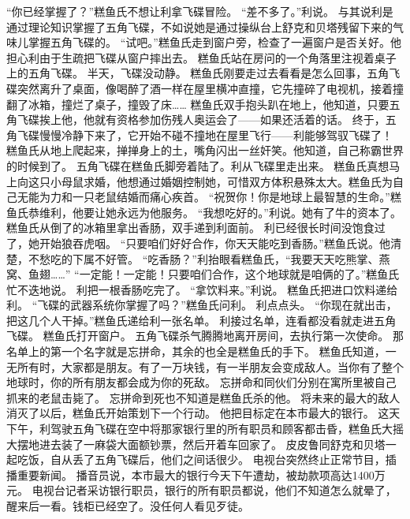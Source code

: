 \documentclass[a4paper,12pt,UTF8,twoside]{ctexbook}
\begin{document}
        “你已经掌握了？”糕鱼氏不想让利拿飞碟冒险。 
        “差不多了。”利说。 
        与其说利是通过理论知识掌握了五角飞碟，不如说她是通过操纵台上舒克和贝塔残留下来的气味儿掌握五角飞碟的。 
        “试吧。”糕鱼氏走到窗户旁，检查了一遍窗户是否关好。他担心利由于生疏把飞碟从窗户摔出去。 
        糕鱼氏站在房问的一个角落里注视着桌子上的五角飞碟。 
        半天，飞碟没动静。 
        糕鱼氏刚要走过去看看是怎么回事，五角飞碟突然离升了桌面，像喝醉了酒一样在屋里横冲直撞，它先撞碎了电视机，接着撞翻了冰箱，撞烂了桌子，撞毁了床…… 
        糕鱼氏双手抱头趴在地上，他知道，只要五角飞碟挨上他，他就有资格参加伤残人奥运会了——如果还活着的话。 
        终于，五角飞碟慢慢冷静下来了，它开始不碰不撞地在屋里飞行——利能够驾驭飞碟了！ 
        糕鱼氏从地上爬起来，掸掸身上的土，嘴角闪出一丝奸笑。他知道，自己称霸世界的时候到了。 
        五角飞碟在糕鱼氏脚旁着陆了。利从飞碟里走出来。 
        糕鱼氏真想马上向这只小母鼠求婚，他想通过婚姻控制她，可惜双方体积悬殊太大。糕鱼氏为自己无能为力和一只老鼠结婚而痛心疾首。 
        “祝贺你！你是地球上最智慧的生命。”糕鱼氏恭维利，他要让她永远为他服务。 
        “我想吃好的。”利说。她有了牛的资本了。 
        糕鱼氏从倒了的冰箱里拿出香肠，双手递到利面前。 
        利已经很长时间没饱食过了，她开始狼吞虎咽。 
        “只要咱们好好合作，你天天能吃到香肠。”糕鱼氏说。他清楚，不愁吃的下属不好管。 
        “吃香肠？”利抬眼看糕鱼氏，“我要天天吃熊掌、燕窝、鱼翅……” 
        “一定能！一定能！只要咱们合作，这个地球就是咱俩的了。”糕鱼氏忙不迭地说。 
        利把一根香肠吃完了。 
        “拿饮料来。”利说。 
        糕鱼氏把进口饮料递给利。 
        “飞碟的武器系统你掌握了吗？”糕鱼氏问利。 
        利点点头。 
        “你现在就出击，把这几个人干掉。”糕鱼氏递给利一张名单。 
        利接过名单，连看都没看就走进五角飞碟。 
        糕鱼氏打开窗户。 
        五角飞碟杀气腾腾地离开房间，去执行第一次使命。 
        那名单上的第一个名字就是忘拼命，其余的也全是糕鱼氏的手下。 
        糕鱼氏知道，一无所有时，大家都是朋友。有了一万块钱，有一半朋友会变成敌人。当你有了整个地球时，你的所有朋友都会成为你的死敌。 
        忘拼命和同伙们分别在寓所里被自己抓来的老鼠击毙了。 
        忘拼命到死也不知道是糕鱼氏杀的他。 
        将未来的最大的敌人消灭了以后，糕鱼氏开始策划下一个行动。 
        他把目标定在本市最大的银行。 
        这天下午，利驾驶五角飞碟在空中将那家银行里的所有职员和顾客都击昏，糕鱼氏大摇大摆地进去装了一麻袋大面额钞票，然后开着车回家了。 
        皮皮鲁同舒克和贝塔一起吃饭，自从丢了五角飞碟后，他们之间话很少。 
        电视台突然终止正常节目，插播重要新闻。 
        播音员说，本市最大的银行今天下午遭劫，被劫款项高达1400万元。 
        电视台记者采访银行职员，银行的所有职员都说，他们不知道怎么就晕了，醒来后一看。钱柜已经空了。没任何人看见歹徒。 
\end{document}
